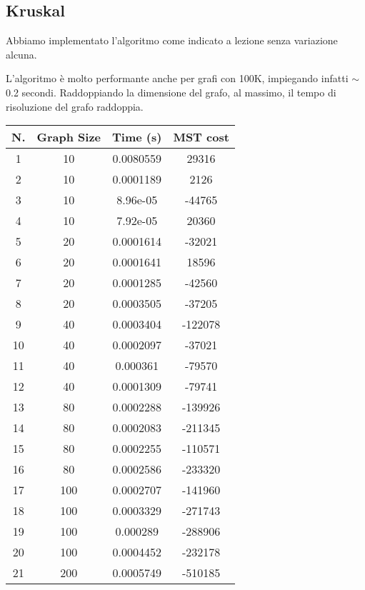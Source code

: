 \subsection{Kruskal}
Abbiamo implementato l'algoritmo come indicato a lezione senza variazione alcuna.


L'algoritmo è molto performante anche per grafi con 100K, impiegando infatti $\sim$0.2 secondi. Raddoppiando la dimensione del grafo, al massimo, il tempo di risoluzione del grafo raddoppia. 

\begin{table}[H]
	\centering
	\begin{tabular}{|c|c|c|c|}
		\hline
		\textbf{N.} & \textbf{Graph Size} & \textbf{Time (s)} & \textbf{MST cost}\\ 
		\hline
		1 & 10 & 0.0080559 & 29316\\
		\hline
		2 & 10 & 0.0001189 & 2126\\
		\hline
		3 & 10 & 8.96e-05 & -44765\\
		\hline
		4 & 10 & 7.92e-05 & 20360\\
		\hline\hline
		5 & 20 & 0.0001614 & -32021\\
		\hline
		6 & 20 & 0.0001641 & 18596\\
		\hline
		7 & 20 & 0.0001285 & -42560\\
		\hline
		8 & 20 & 0.0003505 & -37205\\
		\hline\hline
		9 & 40 & 0.0003404 & -122078\\
		\hline
		10 & 40 & 0.0002097 & -37021\\
		\hline
		11 & 40 & 0.000361 & -79570\\
		\hline
		12 & 40 & 0.0001309 & -79741\\
		\hline\hline
		13 & 80 & 0.0002288 & -139926\\
		\hline
		14 & 80 & 0.0002083 & -211345\\
		\hline
		15 & 80 & 0.0002255 & -110571\\
		\hline
		16 & 80 & 0.0002586 & -233320\\
		\hline\hline
		17 & 100 & 0.0002707 & -141960\\
		\hline
		18 & 100 & 0.0003329 & -271743\\
		\hline
		19 & 100 & 0.000289 & -288906\\
		\hline
		20 & 100 & 0.0004452 & -232178\\
		\hline\hline
		21 & 200 & 0.0005749 & -510185\\

\end{tabular}
\end{table}
